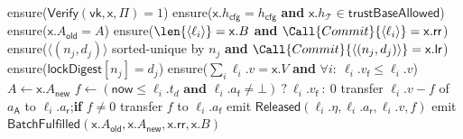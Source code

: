 \begin{algorithm}[!htbp]
\caption{Settlement $\textsc{FulfilBatch}$}\label{alg:bridge-settle}
\begin{algorithmic}[0]
  \State ensure($\mathsf{Verify}(\mathsf{vk},\mathsf{x},\Pi) = 1$)
  \State ensure($\mathsf{x}.h_\mathsf{cfg} = h_\mathsf{cfg}$ \textbf{and} $\mathsf{x}.h_\mathcal{T} \in \mathsf{trustBaseAllowed}$)
  \State ensure($\mathsf{x}.A_\mathsf{old} = A$) 
  \State ensure($\len{\langle\ell_i\rangle} = \mathsf{x}.B$ \textbf{and} $\Call{Commit}{\langle\ell_i\rangle} = \mathsf{x}.\mathsf{rr}$)
  \State ensure($\langle(n_j,d_j)\rangle$ sorted-unique by $n_j$ \textbf{and} $\Call{Commit}{\langle(n_j,d_j)\rangle} = \mathsf{x}.\mathsf{lr}$)
    \State ensure($\mathsf{lockDigest}[n_j] = d_j$)
  \EndFor
  \State ensure($\sum_i \ell_i.v = \mathsf{x}.V$ \textbf{and} $\forall i:\ \ell_i.v_\mathsf{f} \le \ell_i.v$)
  \State $A \gets \mathsf{x}.A_\mathsf{new}$ 
    \State $f \gets (\mathsf{now} \le \ell_i.t_d \textbf{ and } \ell_i.a_\mathsf{f} \ne \bot)\ ?\ \ell_i.v_\mathsf{f}\ :\ 0$ 
    \State transfer $\ell_i.v - f$ of $a_\mathsf{A}$ to $\ell_i.a_\mathsf{r}$;\quad \textbf{if} $f \ne 0$ transfer $f$ to $\ell_i.a_\mathsf{f}$
    \State emit $\mathsf{Released}(\ell_i.\eta, \ell_i.a_\mathsf{r}, \ell_i.v, f)$
  \EndFor
  \State emit $\mathsf{BatchFulfilled}(\mathsf{x}.A_\mathsf{old}, \mathsf{x}.A_\mathsf{new}, \mathsf{x}.\mathsf{rr}, \mathsf{x}.B)$
\EndFunction
\end{algorithmic}
\end{algorithm}

